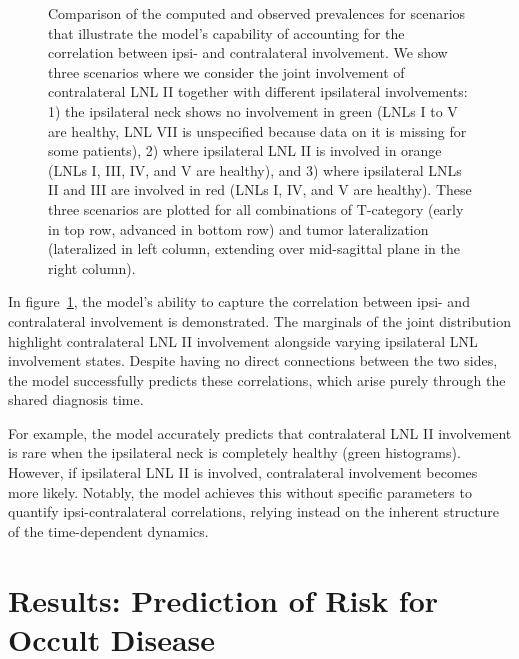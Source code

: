 \documentclass[
  sn-mathphys-num,
]{sn-jnl}
\makeatletter
\newcommand*\pandocbounded[1]{%
  \sbox\pandoc@box{#1}%
  \Gscale@div\@tempa{\textheight}{\dimexpr\ht\pandoc@box+\dp\pandoc@box\relax}%
  \Gscale@div\@tempb{\linewidth}{\wd\pandoc@box}%
  \ifdim\@tempb\p@<\@tempa\p@\let\@tempa\@tempb\fi%
  \ifdim\@tempa\p@<\p@\scalebox{\@tempa}{\usebox\pandoc@box}%
  \else\usebox{\pandoc@box}%
  \fi%
}
\makeatother
\begin{document}
\begin{figure}

\centering{

\pandocbounded{}

}

\caption{\label{fig-model-prevalences-with-ipsi}Comparison of the
computed and observed prevalences for scenarios that illustrate the
model's capability of accounting for the correlation between ipsi- and
contralateral involvement. We show three scenarios where we consider the
joint involvement of contralateral LNL II together with different
ipsilateral involvements: 1) the ipsilateral neck shows no involvement
in green (LNLs I to V are healthy, LNL VII is unspecified because data
on it is missing for some patients), 2) where ipsilateral LNL II is
involved in orange (LNLs I, III, IV, and V are healthy), and 3) where
ipsilateral LNLs II and III are involved in red (LNLs I, IV, and V are
healthy). These three scenarios are plotted for all combinations of
T-category (early in top row, advanced in bottom row) and tumor
lateralization (lateralized in left column, extending over mid-sagittal
plane in the right column).}

\end{figure}%

In figure~\ref{fig-model-prevalences-with-ipsi}, the model's ability to
capture the correlation between ipsi- and contralateral involvement is
demonstrated. The marginals of the joint distribution highlight
contralateral LNL II involvement alongside varying ipsilateral LNL
involvement states. Despite having no direct connections between the two
sides, the model successfully predicts these correlations, which arise
purely through the shared diagnosis time.

For example, the model accurately predicts that contralateral LNL II
involvement is rare when the ipsilateral neck is completely healthy
(green histograms). However, if ipsilateral LNL II is involved,
contralateral involvement becomes more likely. Notably, the model
achieves this without specific parameters to quantify ipsi-contralateral
correlations, relying instead on the inherent structure of the
time-dependent dynamics.

\section{Results: Prediction of Risk for Occult
Disease}\label{sec-results-risk}
\end{document}
